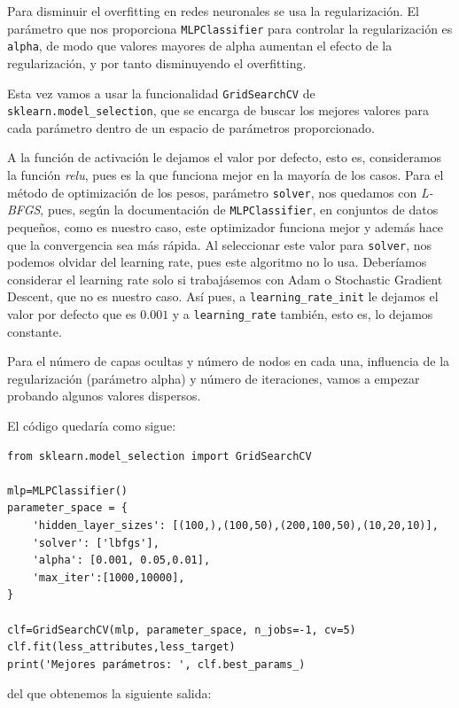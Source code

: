 \documentclass[a4paper,11pt]{article}
\begin{document}
Para disminuir el overfitting en redes neuronales se usa la regularización. El parámetro que nos proporciona \texttt{MLPClassifier} para controlar la regularización es \texttt{alpha}, de modo que valores mayores de alpha aumentan el efecto de la regularización, y por tanto disminuyendo el overfitting. 

 
Esta vez vamos a usar la funcionalidad  \texttt{GridSearchCV} de \texttt{sklearn.model_selection}, que se encarga de buscar los mejores valores para cada parámetro dentro de un espacio de parámetros proporcionado. 


A la función de activación le dejamos el valor por defecto, esto es, consideramos la función \textit{relu}, pues es la que funciona mejor en la mayoría de los casos. Para el método de optimización de los pesos, parámetro \texttt{solver}, nos quedamos con \textit{L-BFGS}, pues, según la documentación de \texttt{MLPClassifier}, en conjuntos de datos pequeños, como es nuestro caso, este optimizador funciona mejor y además hace que la convergencia sea más rápida. Al seleccionar este valor para \texttt{solver}, nos podemos olvidar del learning rate, pues este algoritmo no lo usa. Deberíamos considerar el learning rate solo si trabajásemos con Adam o Stochastic Gradient Descent, que no es nuestro caso. Así pues, a \texttt{learning_rate_init} le dejamos el valor por defecto que es $0.001$ y a \texttt{learning_rate} también, esto es, lo dejamos constante. 
 
Para el número de capas ocultas y número de nodos en cada una, influencia de la regularización (parámetro alpha) y número de iteraciones, vamos a empezar probando algunos valores dispersos. 

El código quedaría como sigue:
 
\begin{verbatim}
from sklearn.model_selection import GridSearchCV

mlp=MLPClassifier()
parameter_space = {
	'hidden_layer_sizes': [(100,),(100,50),(200,100,50),(10,20,10)],
	'solver': ['lbfgs'],
	'alpha': [0.001, 0.05,0.01],
	'max_iter':[1000,10000],
}

clf=GridSearchCV(mlp, parameter_space, n_jobs=-1, cv=5)
clf.fit(less_attributes,less_target)
print('Mejores parámetros: ', clf.best_params_)
 \end{verbatim}
 
 
 del que obtenemos la siguiente salida:
 
\end{document}

